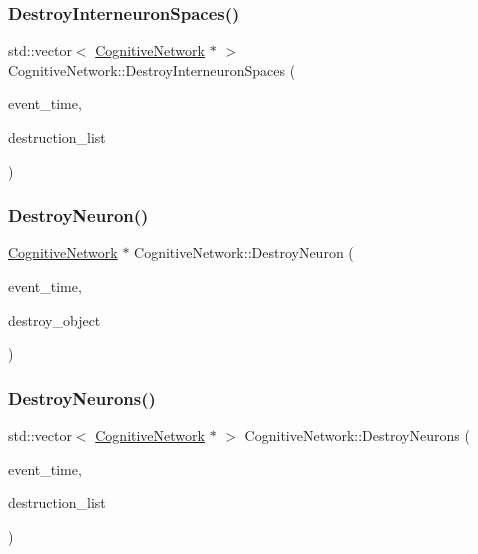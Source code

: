 \subsubsection{\texorpdfstring{Destroy\+Interneuron\+Spaces()}{DestroyInterneuronSpaces()}}
{\footnotesize\ttfamily std\+::vector$<$ \mbox{\hyperlink{classCognitiveNetwork}{Cognitive\+Network}} $\ast$ $>$ Cognitive\+Network\+::\+Destroy\+Interneuron\+Spaces (\begin{DoxyParamCaption}\item[{std\+::chrono\+::time\+\_\+point$<$ \mbox{\hyperlink{universe_8h_a0ef8d951d1ca5ab3cfaf7ab4c7a6fd80}{Clock}} $>$}]{event\+\_\+time,  }\item[{std\+::vector$<$ \mbox{\hyperlink{classCognitiveNetwork}{Cognitive\+Network}} $\ast$$>$}]{destruction\+\_\+list }\end{DoxyParamCaption})}

\mbox{\label{classCognitiveNetwork_ab3318f517da206ad4286b6cc22acf520}} 
\subsubsection{\texorpdfstring{Destroy\+Neuron()}{DestroyNeuron()}}
{\footnotesize\ttfamily \mbox{\hyperlink{classCognitiveNetwork}{Cognitive\+Network}} $\ast$ Cognitive\+Network\+::\+Destroy\+Neuron (\begin{DoxyParamCaption}\item[{std\+::chrono\+::time\+\_\+point$<$ \mbox{\hyperlink{universe_8h_a0ef8d951d1ca5ab3cfaf7ab4c7a6fd80}{Clock}} $>$}]{event\+\_\+time,  }\item[{\mbox{\hyperlink{classCognitiveNetwork}{Cognitive\+Network}} $\ast$}]{destroy\+\_\+object }\end{DoxyParamCaption})}

\mbox{\label{classCognitiveNetwork_af2f706043a0c227b93877e29b056f3c9}} 
\subsubsection{\texorpdfstring{Destroy\+Neurons()}{DestroyNeurons()}}
{\footnotesize\ttfamily std\+::vector$<$ \mbox{\hyperlink{classCognitiveNetwork}{Cognitive\+Network}} $\ast$ $>$ Cognitive\+Network\+::\+Destroy\+Neurons (\begin{DoxyParamCaption}\item[{std\+::chrono\+::time\+\_\+point$<$ \mbox{\hyperlink{universe_8h_a0ef8d951d1ca5ab3cfaf7ab4c7a6fd80}{Clock}} $>$}]{event\+\_\+time,  }\item[{std\+::vector$<$ \mbox{\hyperlink{classCognitiveNetwork}{Cognitive\+Network}} $\ast$$>$}]{destruction\+\_\+list }\end{DoxyParamCaption})}

